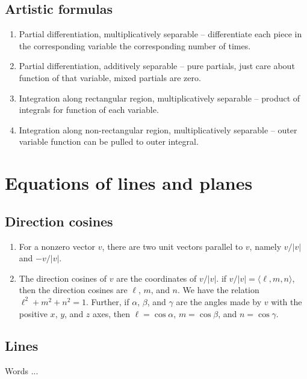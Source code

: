 \documentclass[10pt]{amsart}
\begin{document}
\subsection{Artistic formulas}

\begin{enumerate}
\item Partial differentiation, multiplicatively separable --
  differentiate each piece in the corresponding variable the
  corresponding number of times.
\item Partial differentiation, additively separable -- pure partials,
  just care about function of that variable, mixed partials are zero.
\item Integration along rectangular region, multiplicatively
  separable -- product of integrals for function of each variable.
\item Integration along non-rectangular region, multiplicatively
  separable -- outer variable function can be pulled to outer integral.
\end{enumerate}
\section{Equations of lines and planes}
\subsection{Direction cosines}

\begin{enumerate}
\item For a nonzero vector $v$, there are two unit vectors parallel to
  $v$, namely $v/|v|$ and $-v/|v|$.
\item The direction cosines of $v$ are the coordinates of $v/|v|$. if
  $v/|v| = \langle \ell,m,n \rangle$, then the direction cosines are
  $\ell$, $m$, and $n$. We have the relation $\ell^2 + m^2 + n^2 =
  1$. Further, if $\alpha$, $\beta$, and $\gamma$ are the angles made
  by $v$ with the positive $x$, $y$, and $z$ axes, then $\ell = \cos
  \alpha$, $m = \cos \beta$, and $n = \cos \gamma$.
\end{enumerate}

\subsection{Lines}
Words ...
\end{document}
